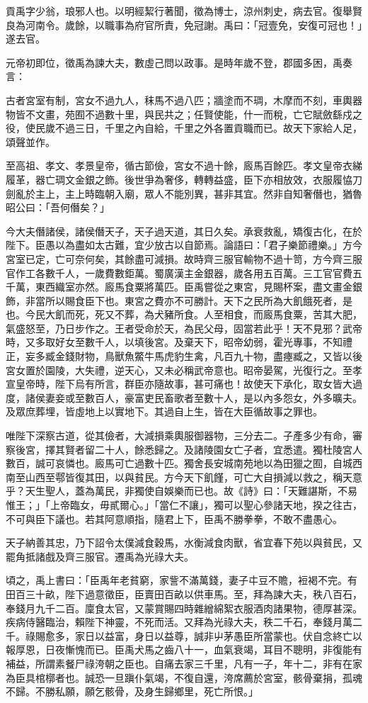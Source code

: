 \begin{pinyinscope}
貢禹字少翁，琅邪人也。以明經絜行著聞，徵為博士，涼州刺史，病去官。復舉賢良為河南令。歲餘，以職事為府官所責，免冠謝。禹曰：「冠壹免，安復可冠也！」遂去官。

元帝初即位，徵禹為諫大夫，數虛己問以政事。是時年歲不登，郡國多困，禹奏言：

古者宮室有制，宮女不過九人，秣馬不過八匹；牆塗而不琱，木摩而不刻，車輿器物皆不文畫，苑囿不過數十里，與民共之；任賢使能，什一而稅，亡它賦斂繇戍之役，使民歲不過三日，千里之內自給，千里之外各置貢職而已。故天下家給人足，頌聲並作。

至高祖、孝文、孝景皇帝，循古節儉，宮女不過十餘，廄馬百餘匹。孝文皇帝衣綈履革，器亡琱文金銀之飾。後世爭為奢侈，轉轉益盛，臣下亦相放效，衣服履恊刀劍亂於主上，主上時臨朝入廟，眾人不能別異，甚非其宜。然非自知奢僭也，猶魯昭公曰：「吾何僭矣？」

今大夫僭諸侯，諸侯僭天子，天子過天道，其日久矣。承衰救亂，矯復古化，在於陛下。臣愚以為盡如太古難，宜少放古以自節焉。論語曰：「君子樂節禮樂。」方今宮室已定，亡可奈何矣，其餘盡可減損。故時齊三服官輸物不過十笥，方今齊三服官作工各數千人，一歲費數鉅萬。蜀廣漢主金銀器，歲各用五百萬。三工官官費五千萬，東西織室亦然。廄馬食粟將萬匹。臣禹嘗從之東宮，見賜杯案，盡文畫金銀飾，非當所以賜食臣下也。東宮之費亦不可勝計。天下之民所為大飢餓死者，是也。今民大飢而死，死又不葬，為犬豬所食。人至相食，而廄馬食粟，苦其大肥，氣盛怒至，乃日步作之。王者受命於天，為民父母，固當若此乎！天不見邪？武帝時，又多取好女至數千人，以填後宮。及棄天下，昭帝幼弱，霍光專事，不知禮正，妄多臧金錢財物，鳥獸魚鱉牛馬虎豹生禽，凡百九十物，盡瘞臧之，又皆以後宮女置於園陵，大失禮，逆天心，又未必稱武帝意也。昭帝晏駕，光復行之。至孝宣皇帝時，陛下烏有所言，群臣亦隨故事，甚可痛也！故使天下承化，取女皆大過度，諸侯妻妾或至數百人，豪富吏民畜歌者至數十人，是以內多怨女，外多曠夫。及眾庶葬埋，皆虛地上以實地下。其過自上生，皆在大臣循故事之罪也。

唯陛下深察古道，從其儉者，大減損乘輿服御器物，三分去二。子產多少有命，審察後宮，擇其賢者留二十人，餘悉歸之。及諸陵園女亡子者，宜悉遣。獨杜陵宮人數百，誠可哀憐也。廄馬可亡過數十匹。獨舍長安城南苑地以為田獵之囿，自城西南至山西至鄠皆復其田，以與貧民。方今天下飢饉，可亡大自損減以救之，稱天意乎？天生聖人，蓋為萬民，非獨使自娛樂而已也。故《詩》曰：「天難諶斯，不易惟王；」「上帝臨女，毋貳爾心。」「當仁不讓」，獨可以聖心參諸天地，揆之往古，不可與臣下議也。若其阿意順指，隨君上下，臣禹不勝拳拳，不敢不盡愚心。

天子納善其忠，乃下詔令太僕減食穀馬，水衡減食肉獸，省宜春下苑以與貧民，又罷角抵諸戲及齊三服官。遷禹為光祿大夫。

頃之，禹上書曰：「臣禹年老貧窮，家訾不滿萬錢，妻子㐄豆不贍，裋褐不完。有田百三十畝，陛下過意徵臣，臣賣田百畝以供車馬。至，拜為諫大夫，秩八百石，奉錢月九千二百。廩食太官，又蒙賞賜四時雜繒綿絮衣服酒肉諸果物，德厚甚深。疾病侍醫臨治，賴陛下神靈，不死而活。又拜為光祿大夫，秩二千石，奉錢月萬二千。祿賜愈多，家日以益富，身日以益尊，誠非屮茅愚臣所當蒙也。伏自念終亡以報厚恩，日夜慚愧而已。臣禹犬馬之齒八十一，血氣衰竭，耳目不聰明，非復能有補益，所謂素餐尸祿洿朝之臣也。自痛去家三千里，凡有一子，年十二，非有在家為臣具棺槨者也。誠恐一旦蹎仆氣竭，不復自還，洿席薦於宮室，骸骨棄捐，孤魂不歸。不勝私願，願乞骸骨，及身生歸鄉里，死亡所恨。」


\end{pinyinscope}

